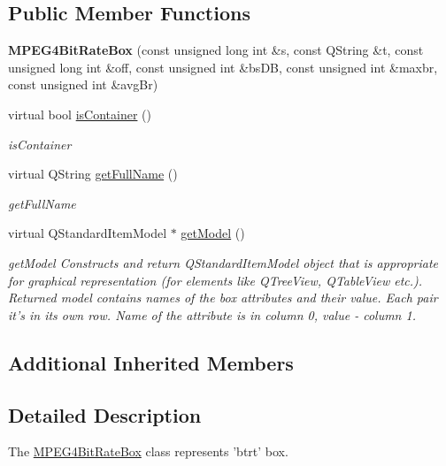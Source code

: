 \subsection*{Public Member Functions}
\begin{DoxyCompactItemize}
\item 
\hypertarget{class_m_p_e_g4_bit_rate_box_a98a08e4da9432cce7fc8de0168b70b9d}{{\bfseries M\-P\-E\-G4\-Bit\-Rate\-Box} (const unsigned long int \&s, const Q\-String \&t, const unsigned long int \&off, const unsigned int \&bs\-D\-B, const unsigned int \&maxbr, const unsigned int \&avg\-Br)}\label{class_m_p_e_g4_bit_rate_box_a98a08e4da9432cce7fc8de0168b70b9d}

\item 
virtual bool \hyperlink{class_m_p_e_g4_bit_rate_box_aafb5c5fe09ef9afbfe91e3cc5ce0ff5d}{is\-Container} ()
\begin{DoxyCompactList}\small\item\em is\-Container \end{DoxyCompactList}\item 
virtual Q\-String \hyperlink{class_m_p_e_g4_bit_rate_box_a5ee8e5653c4d5683e85c6b9f5b6746a1}{get\-Full\-Name} ()
\begin{DoxyCompactList}\small\item\em get\-Full\-Name \end{DoxyCompactList}\item 
virtual Q\-Standard\-Item\-Model $\ast$ \hyperlink{class_m_p_e_g4_bit_rate_box_aee967785d4fb16f784b5b6dffcd850a8}{get\-Model} ()
\begin{DoxyCompactList}\small\item\em get\-Model Constructs and return Q\-Standard\-Item\-Model object that is appropriate for graphical representation (for elements like Q\-Tree\-View, Q\-Table\-View etc.). Returned model contains names of the box attributes and their value. Each pair it's in its own row. Name of the attribute is in column 0, value -\/ column 1. \end{DoxyCompactList}\end{DoxyCompactItemize}
\subsection*{Additional Inherited Members}


\subsection{Detailed Description}
The \hyperlink{class_m_p_e_g4_bit_rate_box}{M\-P\-E\-G4\-Bit\-Rate\-Box} class represents 'btrt' box. 

